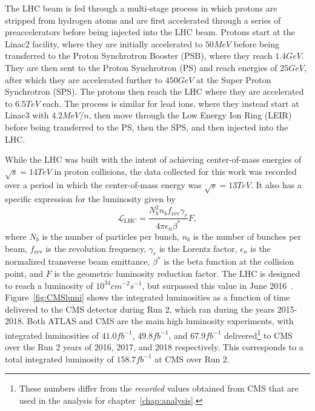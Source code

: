 The LHC beam is fed through a multi-stage process in which protons are stripped from hydrogen atoms and are first accelerated through a series of preaccelerators before being injected into the LHC beam.
Protons start at the Linac2 facility, where they are initially accelerated to $50\unit{MeV}$ before being transferred to the Proton Synchrotron Booster (PSB), where they reach $1.4\unit{GeV}$.
They are then sent to the Proton Synchrotron (PS) and reach energies of $25\unit{GeV}$, after which they are accelerated further to $450\unit{GeV}$ at the Super Proton Synchrotron (SPS).
The protons then reach the LHC where they are accelerated to $6.5\unit{TeV}$ each.
The process is similar for lead ions, where they instead start at Linac3 with $4.2\unit{MeV/n}$, then move through the Low Energy Ion Ring (LEIR) before being transferred to the PS, then the SPS, and then injected into the LHC.

While the LHC was built with the intent of achieving center-of-mass energies of $\sqrt{s}=14\unit{TeV}$ in proton collisions, the data collected for this work was recorded over a period in which the center-of-mass energy was $\sqrt{s}=13\unit{TeV}$.
It also has a specific expression for the luminosity given by
\begin{equation}
  \mathcal{L}_\mathrm{LHC}=\frac{N_b^2n_bf_\mathrm{rev}\gamma_r}{4\pi\epsilon_n\beta^*}F,
\end{equation}
where $N_b$ is the number of particles per bunch, $n_b$ is the number of bunches per beam, $f_\mathrm{rev}$ is the revolution frequency, $\gamma_r$ is the Lorentz factor, $\epsilon_n$ is the normalized transverse beam emittance, $\beta^*$ is the beta function at the collision point, and $F$ is the geometric luminosity reduction factor.
The LHC is designed to reach a luminosity of $10^{34}\unit{cm^{-2}s^{-1}}$, but surpassed this value in June 2016~\cite{LHClumi}.
Figure~\ref{fig:CMSlumi} shows the integrated luminosities as a function of time delivered to the CMS detector during Run 2, which ran during the years 2015-2018.
Both ATLAS and CMS are the main high luminosity experiments, with integrated luminosities of $41.0\unit{fb^{-1}}$, $49.8\unit{fb^{-1}}$, and $67.9\unit{fb^{-1}}$ delivered\footnote{These numbers differ from the \emph{recorded} values obtained from CMS that are used in the analysis for chapter~\ref{chap:analysis}.} to CMS over the Run 2 years of 2016, 2017, and 2018 respectively.
This corresponds to a total integrated luminosity of $158.7\unit{fb^{-1}}$ at CMS over Run 2.

